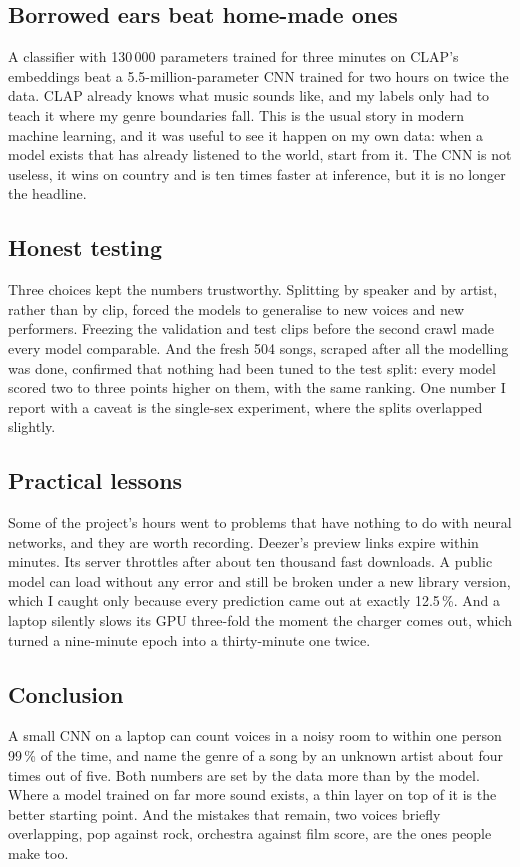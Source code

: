\documentclass[11pt]{article}
\begin{document}
\subsection{Borrowed ears beat home-made ones}
A classifier with 130\,000 parameters trained for three minutes on CLAP's embeddings beat a 5.5-million-parameter CNN trained for two hours on twice the data. CLAP already knows what music sounds like, and my labels only had to teach it where my genre boundaries fall. This is the usual story in modern machine learning, and it was useful to see it happen on my own data: when a model exists that has already listened to the world, start from it. The CNN is not useless, it wins on country and is ten times faster at inference, but it is no longer the headline.

\subsection{Honest testing}
Three choices kept the numbers trustworthy. Splitting by speaker and by artist, rather than by clip, forced the models to generalise to new voices and new performers. Freezing the validation and test clips before the second crawl made every model comparable. And the fresh 504 songs, scraped after all the modelling was done, confirmed that nothing had been tuned to the test split: every model scored two to three points higher on them, with the same ranking. One number I report with a caveat is the single-sex experiment, where the splits overlapped slightly.

\subsection{Practical lessons}
Some of the project's hours went to problems that have nothing to do with neural networks, and they are worth recording. Deezer's preview links expire within minutes. Its server throttles after about ten thousand fast downloads. A public model can load without any error and still be broken under a new library version, which I caught only because every prediction came out at exactly 12.5\,\%. And a laptop silently slows its GPU three-fold the moment the charger comes out, which turned a nine-minute epoch into a thirty-minute one twice.

\subsection{Conclusion}
A small CNN on a laptop can count voices in a noisy room to within one person 99\,\% of the time, and name the genre of a song by an unknown artist about four times out of five. Both numbers are set by the data more than by the model. Where a model trained on far more sound exists, a thin layer on top of it is the better starting point. And the mistakes that remain, two voices briefly overlapping, pop against rock, orchestra against film score, are the ones people make too.
\end{document}
